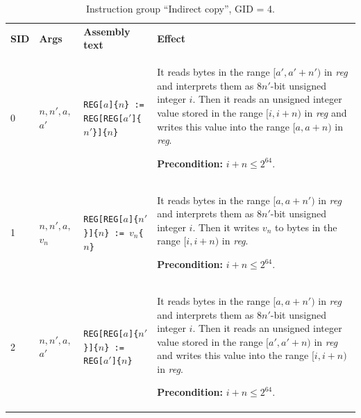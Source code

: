 \documentclass[10pt,twocolumn]{article}
\begin{document}
\begin{table}[!h]
\begin{center}
\def\arraystretch{1.5}
\begin{tabular}{lp{1.2cm}p{5.5cm}p{7.5cm}}
\textbf{SID} & \textbf{Args} & \textbf{Assembly text} & \textbf{Effect}
\\

0 & $ n,n',a,$  $a' $ %
& \texttt{REG[}$ a $\texttt{]\{}$ n $\texttt{\} := REG[REG[}$ a' $\texttt{]\{}$
n' $\texttt{\}]\{}$ n $\texttt{\}} %
& It reads bytes in the range $ [a',a'+n') $ in \textit{reg} and interprets them
as $ 8n' $-bit unsigned integer $ i $. Then it reads an unsigned integer value
stored in the range $ [i,i+n) $ in \textit{reg} and writes this value into the
range $ [a,a+n) $ in \textit{reg}.

\textbf{Precondition:} $ i + n \leq 2^{64} $. \\

1 & $ n,n',a,$  $v_n $ %
& \texttt{REG[REG[}$ a $\texttt{]\{}$ n' $\texttt{\}]\{}$ n $\texttt{\} := }$
v_n $\texttt{\{}$ n $\texttt{\}} %
& It reads bytes in the range $ [a,a+n') $ in \textit{reg} and interprets them
as $ 8n' $-bit unsigned integer $ i $. Then it writes $ v_n $ to bytes in the
range $ [i,i+n) $ in \textit{reg}.

\textbf{Precondition:} $ i + n \leq 2^{64} $. \\

2 & $ n,n',a,$  $a' $ %
& \texttt{REG[REG[}$ a $\texttt{]\{}$ n' $\texttt{\}]\{}$ n $\texttt{\} :=
REG[}$ a' $\texttt{]\{}$ n $\texttt{\}} %
& It reads bytes in the range $ [a,a+n') $ in \textit{reg} and interprets them
as $ 8n' $-bit unsigned integer $ i $. Then it reads an unsigned integer value
stored in the range $ [a',a'+n) $ in \textit{reg} and writes this value into the
range $ [i,i+n) $ in \textit{reg}.

\textbf{Precondition:} $ i + n \leq 2^{64} $. \\

\end{tabular}
\end{center}
\caption{Instruction group ``Indirect copy'', GID = 4.}
\label{tab:igroup:indirectcopy}
\end{table}


\clearpage

\end{document}
